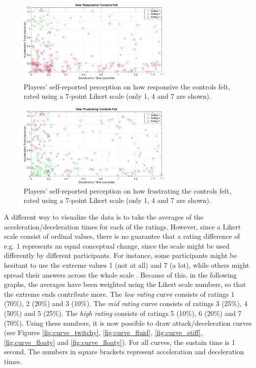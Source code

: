 \begin{figure}[htbp]
\centering
\includegraphics[width=0.67\textwidth]{Pics/Classes/Responsive_classes}
\caption{Players' self-reported perception on how responsive the controls felt, rated using a 7-point Likert scale (only 1, 4 and 7 are shown).}
\label{fig:responsive}
\end{figure}

\begin{figure}[htbp]
\centering
\includegraphics[width=0.67\textwidth]{Pics/Classes/Frustration_classes}
\caption{Players' self-reported perception on how frustrating the controls felt, rated using a 7-point Likert scale (only 1, 4 and 7 are shown).}
\label{fig:frustration}
\end{figure}

A different way to visualize the data is to take the averages of the acceleration/deceleration times for each of the ratings. However, since a Likert scale consist of ordinal values, there is no guarantee that a rating difference of e.g. 1 represents an equal conceptual change, since the scale might be used differently by different participants. For instance, some participants might be hesitant to use the extreme values 1 (not at all) and 7 (a lot), while others might spread their answers across the whole scale \cite{cunningham}. Because of this, in the following graphs, the averages have been weighted using the Likert scale numbers, so that the extreme ends contribute more. The \textit{low rating} curve consists of ratings 1 (70\%), 2 (20\%) and 3 (10\%). The \textit{mid rating} curve consists of ratings 3 (25\%), 4 (50\%) and 5 (25\%). The \textit{high rating} consists of ratings 5 (10\%), 6 (20\%) and 7 (70\%). Using these numbers, it is now possible to draw attack/deceleration curves (see Figures \ref{fig:curve_twitchy}, \ref{fig:curve_fluid}, \ref{fig:curve_stiff}, \ref{fig:curve_floaty} and \ref{fig:curve_floaty}). For all curves, the sustain time is 1 second. The numbers in square brackets represent acceleration and deceleration times.

